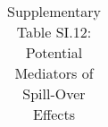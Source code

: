 \begin{longtable}{llcccccccccc}
\caption{Supplementary Table SI.12: Potential Mediators of Spill-Over Effects} \label{tab:pap__acts} \\                                                                                                                                                                                                                                                                                                                                                                                                                                                                                                                                                                                                                                                                                                                                                                                   
\hline \hline                                                                                                                                                                                                                                                                                                                                                                                                                                                                                                                                                                                                                                                                                                                                                                                                                                                                             

\end{longtable}

